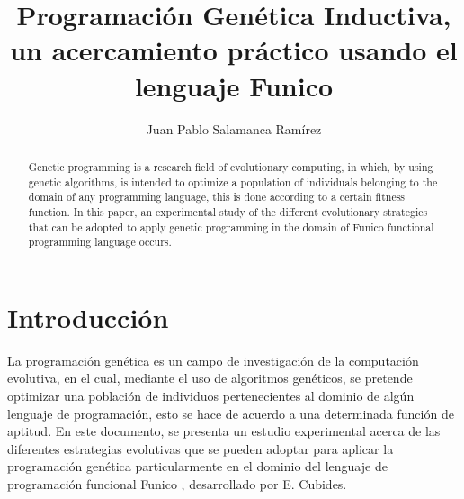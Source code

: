 \documentclass{llncs}
\begin{document}
\title{Programación Genética Inductiva, un acercamiento práctico usando el lenguaje Funico}
%
%
\author{Juan Pablo Salamanca Ramírez}
%
%
\tocauthor{}
%

\maketitle

\begin{abstract}
Genetic programming is a research field of evolutionary computing, in which, by using genetic algorithms, is intended to optimize a population of individuals belonging to the domain of any programming language, this is done according to a certain fitness function.
In this paper, an experimental study of the different evolutionary strategies that can be adopted to apply genetic programming in the domain of Funico functional programming language occurs.
\end{abstract}
%



\section{Introducción}
La programación genética es un campo de investigación de la computación evolutiva, en el cual, mediante el uso de algoritmos genéticos, se pretende optimizar una población de individuos pertenecientes al dominio de algún lenguaje de programación, esto se hace de acuerdo a una determinada función de aptitud.
En este documento, se presenta un estudio experimental acerca de las diferentes estrategias evolutivas que se pueden adoptar para aplicar la programación genética particularmente en el dominio del lenguaje de programación funcional Funico \cite{cub:gom}, desarrollado por E. Cubides.

\end{document}
